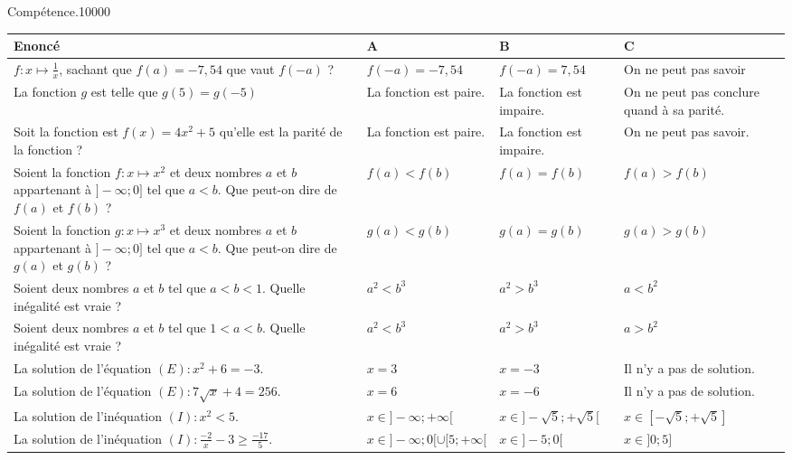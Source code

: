 \begin{pageAuto} %

\begin{ExoAutoN}{Compétence.}{1}{0}{0}{0}{0}
\vspace{.2cm}
\begin{tabular}{|M{.4\linewidth}|M{.17\linewidth}|M{.17\linewidth}|M{.17\linewidth}|}
\hline
Enoncé & A & B & C \\\hline
$f:x\mapsto \frac{1}{x}$, sachant que $f(a)=-7,54$ que vaut $f(-a)$ ? & $f(-a)=-7,54$ & $f(-a)=7,54$ & On ne peut pas savoir \\\hline
La fonction $g$ est telle que $g(5)=g(-5)$ & La fonction est paire. & La fonction est impaire. & On ne peut pas conclure quand à sa parité. \\\hline
Soit la fonction est $f(x)=4x^2+5$ qu'elle est la parité de la fonction ? & La fonction est paire. & La fonction est impaire. & On ne peut pas savoir. \\\hline
Soient la fonction $f:x\mapsto x^2$ et deux nombres $a$ et $b$ appartenant à $]-\infty;0]$ tel que $a<b$. Que peut-on dire de $f(a)$ et $f(b)$ ? & $f(a)<f(b)$ & $f(a)=f(b)$ & $f(a)>f(b)$ \\\hline
Soient la fonction $g:x\mapsto x^3$ et deux nombres $a$ et $b$ appartenant à $]-\infty;0]$ tel que $a<b$. Que peut-on dire de $g(a)$ et $g(b)$ ? & $g(a)<g(b)$ & $g(a)=g(b)$ & $g(a)>g(b)$ \\\hline
Soient deux nombres $a$ et $b$ tel que $a<b<1$. Quelle inégalité est vraie ? & $a^2<b^3$ & $a^2>b^3$ & $a<b^2$ \\\hline
Soient deux nombres $a$ et $b$ tel que $1<a<b$. Quelle inégalité est vraie ? & $a^2<b^3$ & $a^2>b^3$ & $a>b^2$ \\\hline
La solution de l'équation $(E):x^2+6=-3$. & $x=3$ & $x=-3$ & Il n'y a pas de solution. \\\hline
La solution de l'équation $(E):7\sqrt{x}+4=256$. & $x=6$ & $x=-6$ & Il n'y a pas de solution. \\\hline
La solution de l'inéquation $(I):x^2<5$. & $x\in]-\infty;+\infty[$ & $x\in]-\sqrt{5};+\sqrt{5}[$ & $x\in[-\sqrt{5};+\sqrt{5}]$ \\\hline
La solution de l'inéquation $(I):\frac{-2}{x}-3\geq\frac{-17}{5}$. & $x\in]-\infty;0[\cup[5;+\infty[$ & $x\in]-5;0[$ & $x\in]0;5]$ \\\hline
\end{tabular}
\end{ExoAutoN}

\end{pageAuto} %

